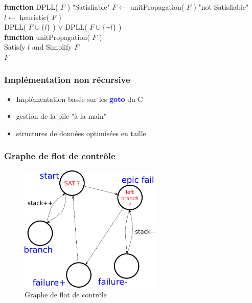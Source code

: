 \documentclass{beamer}
\newcommand{\keyword}[1]{\textbf{\textcolor{blue}{#1}}}
\begin{document}
\begin{algorithm}[h!]
\begin{algorithmic}
\textbf{function} DPLL( $F$ )
    \RETURN "Satisfiable"
  \ENDIF
  \STATE $F \gets$ unitPropagation( $F$ )
    \RETURN "not Satisfiable"
  \ENDIF
  \STATE $l \gets$ heuristic( $F$ ) \\
  \RETURN DPLL( $F \cup\{l\}$ ) $\vee$ DPLL( $F \cup \{\lnot l\}$ ) \\

\textbf{function} unitPropagation( $F$ )\\
  Satisfy $l$ and Simplify $F$ \\
  \RETURN $F$
\ENDWHILE
\end{algorithmic}
\end{algorithm}

\begin{frame}
\frametitle{Implémentation non récursive}

\begin{itemize}
    \item Implémentation basée sur les \keyword{goto} du C
    \item gestion de la pile "à la main"
    \item structures de données optimisées en taille
\end{itemize}
\end{frame}

\begin{frame}
\frametitle{Graphe de flot de contrôle}

\begin{figure}[h]
\includegraphics[width = 0.60\textwidth]{control_flow.png}
  \caption[Graphe de flot de controle]{Graphe de flot de contrôle}
\end{figure}

\end{frame}
\end{document}
